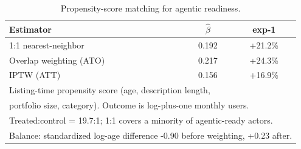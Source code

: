 \begin{table}[t]
  \centering
  \caption{Propensity-score matching for agentic readiness.}
  \label{tab:eligibility_psm}
  \small
  \begin{tabular}{lcc}
    \toprule
    Estimator & $\hat\beta$ & exp-1 \\
    \midrule
    1:1 nearest-neighbor & 0.192 & +21.2\% \\
    Overlap weighting (ATO) & 0.217 & +24.3\% \\
    IPTW (ATT) & 0.156 & +16.9\% \\
    \bottomrule
    \multicolumn{3}{l}{\footnotesize Listing-time propensity score (age, description length,} \\
    \multicolumn{3}{l}{\footnotesize portfolio size, category). Outcome is log-plus-one monthly users.} \\
    \multicolumn{3}{l}{\footnotesize Treated:control = 19.7:1; 1:1 covers a minority of agentic-ready actors.} \\
    \multicolumn{3}{l}{\footnotesize Balance: standardized log-age difference -0.90 before weighting, +0.23 after.}
  \end{tabular}
\end{table}